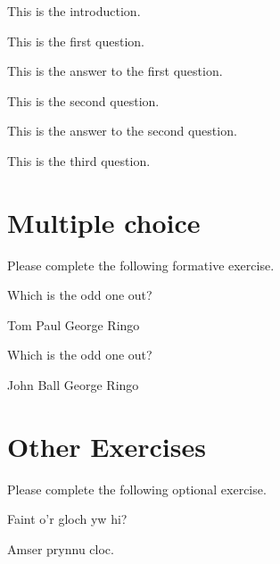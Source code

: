 \documentclass{camel}
\begin{document}
\begin{diagnostic}\label{diag:demo}
This is the introduction.
\begin{questions} 
\question This is the first question.\label{qu:first-question}
\begin{answer} 
This is the answer to the first question.
\end{answer} 
\question This is the second question.\label{qu:second-question}
\begin{answer} 
This is the answer to the second question.
\end{answer} 
\question This is the third question.\label{qu:third-question}
\end{questions} 
\end{diagnostic}

\section{Multiple choice}

\begin{formative}\label{di:beatles} 
Please complete the following formative exercise.
\begin{questions} 
\question Which is the odd one out?  
\begin{choices} 
\correctchoice Tom
\choice Paul 
\choice George 
\choice Ringo 
\end{choices} 
\question Which is the odd one out?  
\begin{choices} 
\choice John 
\correctchoice Ball 
\choice George 
\choice Ringo 
\end{choices} 
\end{questions}
\end{formative}

\section{Other Exercises}

\begin{exercise}
Please complete the following optional exercise.
\begin{questions} 
\question Faint o'r gloch yw hi?
\begin{answer}
Amser prynnu cloc.
\end{answer}
\end{questions}
\end{exercise}
\end{document}
